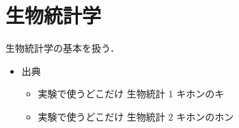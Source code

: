 \part{生物統計学}

生物統計学の基本を扱う．

\begin{itemize}
  \item 出典
        \begin{itemize}
          \item 実験で使うどこだけ 生物統計 1 キホンのキ
          \item 実験で使うどこだけ 生物統計 2 キホンのホン
        \end{itemize}
\end{itemize}